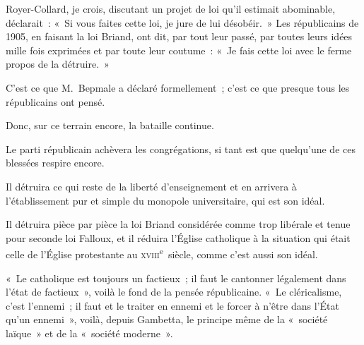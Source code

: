 \documentclass[french,twoside]{book} %
\newcommand{\astertri}{\medskip\par\centerline{\color{rubric}\large\selectfont{\syms ✻\,✻\,✻}}\medskip\par}%
\begin{document}
Royer-Collard, je crois, discutant un projet de loi qu’il estimait abominable, déclarait : « Si vous  faites cette loi, je jure de lui désobéir. » Les républicains de 1905, en faisant la loi Briand, ont dit, par tout leur passé, par toutes leurs idées mille fois exprimées et par toute leur coutume : « Je fais cette loi avec le ferme propos de la détruire. »\par
C’est ce que M. Bepmale a déclaré formellement ; c’est ce que presque tous les républicains ont pensé.\par
Donc, sur ce terrain encore, la bataille continue.\par
Le parti républicain achèvera les congrégations, si tant est que quelqu’une de ces blessées respire encore.\par
Il détruira ce qui reste de la liberté d’enseignement et en arrivera à l’établissement pur et simple du monopole universitaire, qui est son idéal.\par
Il détruira pièce par pièce la loi Briand considérée comme trop libérale et tenue pour seconde loi Falloux, et il réduira l’Église catholique à la situation qui était celle de l’Église protestante au \textsc{xviii}\textsuperscript{e} siècle, comme c’est aussi son idéal.\par
« Le catholique est toujours un factieux ; il faut le cantonner légalement dans l’état de factieux », voilà le fond de la pensée républicaine. « Le cléricalisme, c’est l’ennemi ; il faut et le traiter en ennemi et le forcer à n’être dans l’État qu’un ennemi », voilà, depuis Gambetta, le principe  même de la « société laïque » et de la « société moderne ».\par

\astertri
\end{document}
